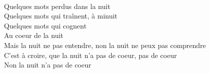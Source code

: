 \\
Quelques mots perdus dans la nuit \\
Quelques mots qui traînent, à minuit \\
Quelques mots qui cognent \\
Au coeur de la nuit \\
Mais la nuit ne pas entendre, non la nuit ne peux pas comprendre \\
C'est à croire, que la nuit n'a pas de coeur, pas de coeur \\
Non la nuit n'a pas de coeur \\